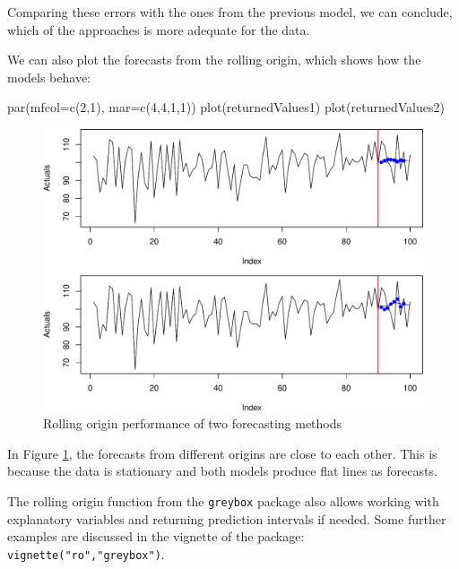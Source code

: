 \documentclass[
]{book}
\newenvironment{Shaded}{\begin{snugshade}}{\end{snugshade}}
\newcommand{\AttributeTok}[1]{\textcolor[rgb]{0.77,0.63,0.00}{#1}}
\newcommand{\DecValTok}[1]{\textcolor[rgb]{0.00,0.00,0.81}{#1}}
\newcommand{\FunctionTok}[1]{\textcolor[rgb]{0.00,0.00,0.00}{#1}}
\newcommand{\NormalTok}[1]{#1}
\theoremstyle{definition}
\theoremstyle{definition}
\theoremstyle{definition}
\theoremstyle{definition}
\theoremstyle{remark}
\begin{document}
Comparing these errors with the ones from the previous model, we can conclude, which of the approaches is more adequate for the data.

We can also plot the forecasts from the rolling origin, which shows how the models behave:

\begin{Shaded}
\begin{Highlighting}[]
\FunctionTok{par}\NormalTok{(}\AttributeTok{mfcol=}\FunctionTok{c}\NormalTok{(}\DecValTok{2}\NormalTok{,}\DecValTok{1}\NormalTok{), }\AttributeTok{mar=}\FunctionTok{c}\NormalTok{(}\DecValTok{4}\NormalTok{,}\DecValTok{4}\NormalTok{,}\DecValTok{1}\NormalTok{,}\DecValTok{1}\NormalTok{))}
\FunctionTok{plot}\NormalTok{(returnedValues1)}
\FunctionTok{plot}\NormalTok{(returnedValues2)}
\end{Highlighting}
\end{Shaded}

\begin{figure}
\centering
\includegraphics{adam_files/figure-latex/roExample01-1.pdf}
\caption{\label{fig:roExample01}Rolling origin performance of two forecasting methods}
\end{figure}

In Figure \ref{fig:roExample01}, the forecasts from different origins are close to each other. This is because the data is stationary and both models produce flat lines as forecasts.

The rolling origin function from the \texttt{greybox} package also allows working with explanatory variables and returning prediction intervals if needed. Some further examples are discussed in the vignette of the package: \texttt{vignette("ro","greybox")}.
\end{document}
